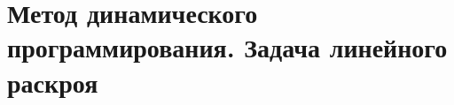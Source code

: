 \documentclass[discrete.tex]{subfiles}
\begin{document}
  \section{Метод динамического программирования. Задача линейного раскроя}
\end{document}
